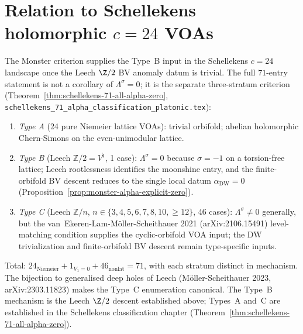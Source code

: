 \section{Relation to Schellekens holomorphic $c=24$ VOAs}
\label{sec:monster-schellekens-extension}

\begin{remark}
\label{rem:schellekens-71-honest}
The Monster criterion supplies the Type~B input in the Schellekens
$c=24$ landscape once the Leech $\Z/2$ BV anomaly datum is trivial.
The full $71$-entry statement is not a corollary of
$\Lambda^\sigma=0$; it is the separate three-stratum criterion
(Theorem~\ref{thm:schellekens-71-all-alpha-zero},
\texttt{schellekens\_71\_alpha\_classification\_platonic.tex}):

\begin{enumerate}[nosep]
\item \emph{Type A} (24 pure Niemeier lattice VOAs): trivial orbifold;
 abelian holomorphic Chern-Simons on the even-unimodular lattice.
\item \emph{Type B} (Leech $\mathbb{Z}/2 = V^{\natural}$, 1 case):
 $\Lambda^{\sigma} = 0$ because $\sigma=-1$ on a torsion-free
 lattice; Leech rootlessness identifies the moonshine entry, and the
 finite-orbifold BV descent reduces to the single local datum
 $\alpha_{\mathrm{DW}} = 0$ (Proposition~\ref{prop:monster-alpha-explicit-zero}).
\item \emph{Type C} (Leech $\mathbb{Z}/n$, $n \in \{3,4,5,6,7,8,10,\geq 12\}$,
 46 cases): $\Lambda^{\sigma} \ne 0$ generally, but the
 van~Ekeren-Lam-M\"oller-Scheithauer 2021 (arXiv:2106.15491)
 level-matching condition supplies the cyclic-orbifold VOA input;
 the DW trivialization and finite-orbifold BV descent remain
 type-specific inputs.
\end{enumerate}

Total:
$24_{\mathrm{Niemeier}} + 1_{V_1=0} + 46_{\mathrm{nonlat}} = 71$,
with each stratum distinct in mechanism.
The bijection to generalised deep holes of Leech (M\"oller-Scheithauer
2023, arXiv:2303.11823) makes the Type~C enumeration canonical. The
Type~B mechanism is the Leech $\Z/2$ descent established above; Types~A
and~C are established in the Schellekens classification chapter
(Theorem~\ref{thm:schellekens-71-all-alpha-zero}).


\end{remark}
